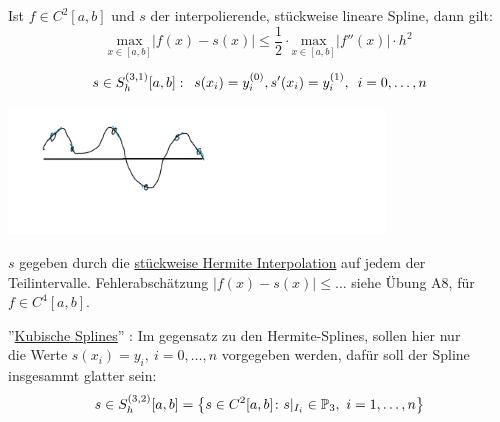 \begin{corollary}
    Ist $f\in C^2[a,b]$ und $s$ der interpolierende, stückweise lineare Spline, dann gilt:\[
    \underset{x\in [a,b]}{\text{max}} |f(x)-s(x)| \leq \frac{1}{2}\cdot \underset{x\in [a,b]}{\text{max}}|f''(x)|\cdot h^2
    \]
\end{corollary}
\begin{example}
    \[s\in S_h^{(3,1)}[a,b]: \hspace{.5em} s(x_i) = y_i^{(0)}, s'(x_i)=y_i^{(1)}, \hspace{.5em} i=0,\dots,n\]
    \begin{center}
        \includegraphics[width=100mm]{Bilder/161122_1.png}
    \end{center}
    $s$ gegeben durch die \underline{stückweise Hermite Interpolation} auf jedem der Teilintervalle.
    Fehlerabschätzung $|f(x)-s(x)|\leq \dots$ siehe Übung A8, für $f\in C^4[a,b]$.\\
\end{example}
''\underline{Kubische Splines}'' : Im gegensatz zu den Hermite-Splines, sollen hier nur \\ die Werte $s(x_i)=y_i,\ 
i=0,\dots, n$ 
vorgegeben werden, dafür soll der Spline insgesammt glatter sein:\[
s\in S_h^{(3,2)}[a,b]=\left\{s\in C^2[a,b]\colon s\vert_{I_i}\in \mathbb{P}_3 , \ i=1,\dots, n\right\}\]
